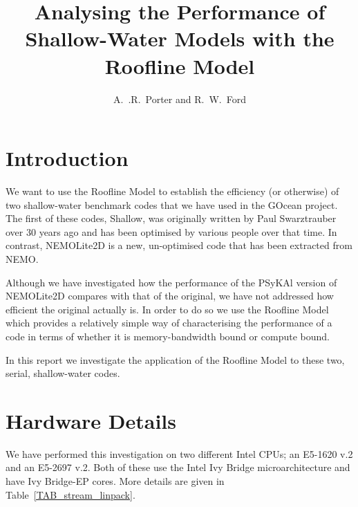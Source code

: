 \documentclass[12pt]{article}
\newcommand{\psykal}{{PS}y{KA}l}
\begin{document}
\title{Analysing the Performance of Shallow-Water Models with the
 Roofline Model}

\author{A.~.R.~Porter and R.~W.~Ford}

\maketitle

\section{Introduction}

We want to use the Roofline Model to establish the efficiency (or
otherwise) of two shallow-water benchmark codes that we have used in
the GOcean project. The first of these codes, Shallow, was originally
written by Paul Swarztrauber over 30 years ago and has been optimised
by various people over that time. In contrast, NEMOLite2D is a new,
un-optimised code that has been extracted from NEMO.

Although we have investigated how the performance of the \psykal
version of NEMOLite2D compares with that of the original, we have not
addressed how efficient the original actually is. In order to do so we
use the Roofline Model~\cite{roofline} which provides a relatively
simple way of characterising the performance of a code in terms of
whether it is memory-bandwidth bound or compute bound.

In this report we investigate the application of the Roofline Model to
these two, serial, shallow-water codes.

\section{Hardware Details}

We have performed this investigation on two different Intel CPUs; an
E5-1620 v.2 and an E5-2697 v.2. Both of these use the Intel Ivy Bridge
microarchitecture and have Ivy Bridge-EP cores. More details are given
in Table~\ref{TAB_stream_linpack}.
\end{document}

